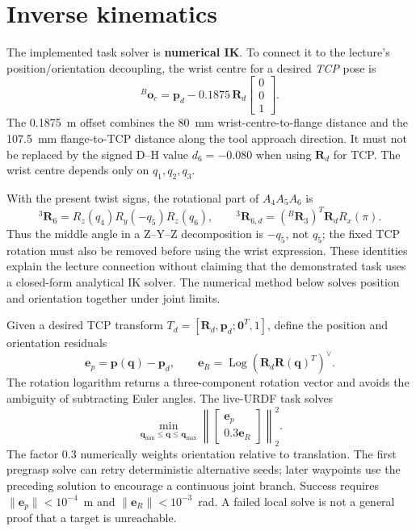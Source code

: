 \documentclass[10pt,a4paper]{article}
\newcommand{\R}{\mathbf R}
\newcommand{\p}{\mathbf p}
\newcommand{\q}{\mathbf q}
\begin{document}
\section{Inverse kinematics}
The implemented task solver is \textbf{numerical IK}. To connect it to the
lecture's position/orientation decoupling, the wrist centre for a desired
\emph{TCP} pose is
\begin{equation}
\boxed{{}^{B}\mathbf o_c=\p_d-0.1875\,\R_d
\begin{bmatrix}0\\0\\1\end{bmatrix}}.
\end{equation}
The 0.1875~m offset combines the 80~mm wrist-centre-to-flange distance and the
107.5~mm flange-to-TCP distance along the tool approach direction. It must not
be replaced by the signed D--H value $d_6=-0.080$ when using $\R_d$ for TCP.
The wrist centre depends only on $q_1,q_2,q_3$.

With the present twist signs, the rotational part of $A_4A_5A_6$ is
\begin{equation}
{}^3\R_6=R_z(q_4)R_y(-q_5)R_z(q_6),\qquad
{}^3\R_{6,d}=({}^B\R_3)^T\R_dR_x(\pi).
\end{equation}
Thus the middle angle in a Z--Y--Z decomposition is $-q_5$, not $q_5$; the
fixed TCP rotation must also be removed before using the wrist expression.
These identities explain the lecture connection without claiming that the
demonstrated task uses a closed-form analytical IK solver. The numerical
method below solves position and orientation together under joint limits.

Given a desired TCP transform $T_d=[\R_d,\p_d;\mathbf0^T,1]$, define the
position and orientation residuals
\begin{equation}
\mathbf e_p=\p(\q)-\p_d,\qquad
\mathbf e_R=\operatorname{Log}\!\left(\R_d\R(\q)^T\right)^\vee.
\end{equation}
The rotation logarithm returns a three-component rotation vector and avoids
the ambiguity of subtracting Euler angles. The live-URDF task solves
\begin{equation}
\min_{\q_{\min}\leq\q\leq\q_{\max}}
\left\|\begin{bmatrix}\mathbf e_p\\0.3\mathbf e_R\end{bmatrix}\right\|_2^2.
\end{equation}
The factor 0.3 numerically weights orientation relative to translation.
The first pregrasp solve can retry deterministic alternative seeds; later
waypoints use the preceding solution to encourage a continuous joint branch.
Success requires $\|\mathbf e_p\|<10^{-4}$~m and
$\|\mathbf e_R\|<10^{-3}$~rad. A failed local solve is not a general proof
that a target is unreachable.
\end{document}
